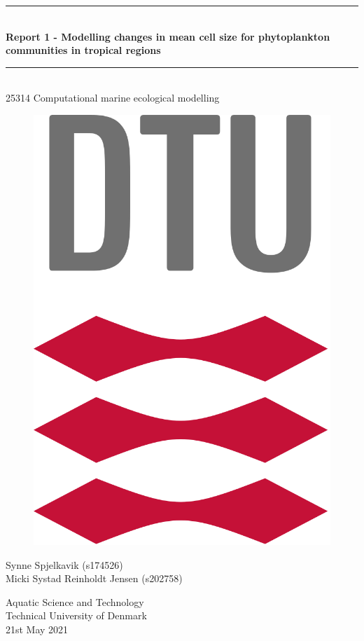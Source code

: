 \begin{titlepage}
\centering \parindent=0pt
\newcommand{\HRule}{\rule{\textwidth}{0.1mm}}
 \HRule\\[0.1cm]\huge\bfseries
Report 1 - Modelling changes in mean cell size for phytoplankton communities in tropical regions
\HRule\\[0.5cm]

\Large 25314 Computational marine ecological modelling \\[2.5cm]
\begin{figure}[H]
  \centering
    \includegraphics[scale=0.20]{Figures/uni-logo.png}
    \label{fig:forside}
\end{figure}
\vspace*{\fill}
Synne Spjelkavik (s174526)\\
Micki Systad Reinholdt Jensen (s202758)\\
\vspace*{\fill}

\begin{flushleft}
\normalsize
Aquatic Science and Technology\\
Technical University of Denmark\\
21st May 2021\\
\end{flushleft}
\end{titlepage}